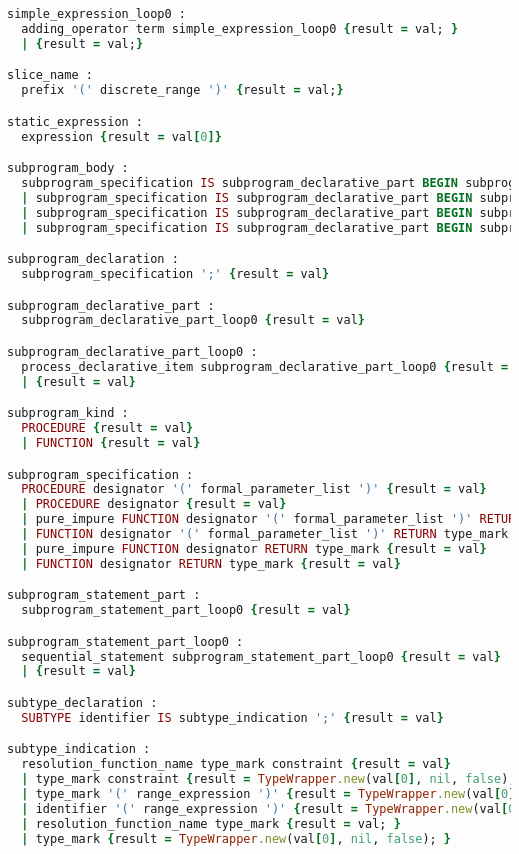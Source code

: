 \begin{lstlisting}[language=Ruby, style=rubystyle]
simple_expression_loop0 :
  adding_operator term simple_expression_loop0 {result = val; }
  | {result = val;}

slice_name :
  prefix '(' discrete_range ')' {result = val;}

static_expression :
  expression {result = val[0]}

subprogram_body :
  subprogram_specification IS subprogram_declarative_part BEGIN subprogram_statement_part END subprogram_kind designator ';' {result = val}
  | subprogram_specification IS subprogram_declarative_part BEGIN subprogram_statement_part END designator ';' {result = val}
  | subprogram_specification IS subprogram_declarative_part BEGIN subprogram_statement_part END subprogram_kind ';' {result = val}
  | subprogram_specification IS subprogram_declarative_part BEGIN subprogram_statement_part END ';' {result = val}

subprogram_declaration :
  subprogram_specification ';' {result = val}

subprogram_declarative_part :
  subprogram_declarative_part_loop0 {result = val}

subprogram_declarative_part_loop0 :
  process_declarative_item subprogram_declarative_part_loop0 {result = val}
  | {result = val}

subprogram_kind :
  PROCEDURE {result = val}
  | FUNCTION {result = val}

subprogram_specification :
  PROCEDURE designator '(' formal_parameter_list ')' {result = val}
  | PROCEDURE designator {result = val}
  | pure_impure FUNCTION designator '(' formal_parameter_list ')' RETURN type_mark {result = val}
  | FUNCTION designator '(' formal_parameter_list ')' RETURN type_mark {result = val}
  | pure_impure FUNCTION designator RETURN type_mark {result = val}
  | FUNCTION designator RETURN type_mark {result = val}

subprogram_statement_part :
  subprogram_statement_part_loop0 {result = val}

subprogram_statement_part_loop0 :
  sequential_statement subprogram_statement_part_loop0 {result = val}
  | {result = val}

subtype_declaration :
  SUBTYPE identifier IS subtype_indication ';' {result = val}

subtype_indication :
  resolution_function_name type_mark constraint {result = val}
  | type_mark constraint {result = TypeWrapper.new(val[0], nil, false);}
  | type_mark '(' range_expression ')' {result = TypeWrapper.new(val[0], val[2], false); }
  | identifier '(' range_expression ')' {result = TypeWrapper.new(val[0], val[2], false);}
  | resolution_function_name type_mark {result = val; }
  | type_mark {result = TypeWrapper.new(val[0], nil, false); }


\end{lstlisting}
